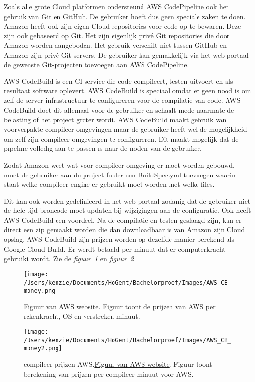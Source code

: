 Zoals alle grote Cloud platformen ondersteund AWS CodePipeline ook het gebruik van Git en GitHub. De gebruiker hoeft dus geen speciale zaken te doen. Amazon heeft ook zijn eigen Cloud repositories voor code op te bewaren. Deze zijn ook gebaseerd op Git. Het zijn eigenlijk privé Git repositories die door Amazon worden aangeboden. Het gebruik verschilt niet tussen GitHub en Amazon zijn privé Git servers. De gebruiker kan gemakkelijk via het web portaal de gewenste Git-projecten toevoegen aan AWS CodePipeline.

AWS CodeBuild is een CI service die code compileert, testen uitvoert en als resultaat software oplevert. AWS CodeBuild is speciaal omdat er geen nood is om zelf de server infrastructuur te configureren voor de compilatie van code. AWS CodeBuild doet dit allemaal voor de gebruiker en schaalt mede naarmate de belasting of het project groter wordt. AWS CodeBuild maakt gebruik van voorverpakte compileer omgevingen maar de gebruiker heeft wel de mogelijkheid om zelf zijn compileer omgevingen te configureren. Dit maakt mogelijk dat de pipeline volledig aan te passen is naar de noden van de gebruiker. 

Zodat Amazon weet wat voor compileer omgeving er moet worden gebouwd, moet de gebruiker aan de project folder een BuildSpec.yml toevoegen waarin staat welke compileer engine er gebruikt moet worden met welke files. 

Dit kan ook worden gedefinieerd in het web portaal zodanig dat de gebruiker niet de hele tijd broncode moet updaten bij wijzigingen aan de configuratie. Ook heeft AWS CodeBuild een voordeel. Na de compilatie en testen geslaagd zijn, kan er direct een zip gemaakt worden die dan downloadbaar is van Amazon zijn Cloud opslag. AWS CodeBuild zijn prijzen worden op dezelfde manier berekend als Google Cloud Build. Er wordt betaald per minuut dat er computerkracht gebruikt wordt. Zie de \emph{figuur~\ref{fig:AWS_CB_money}} en \emph{figuur~\ref{fig:AWS_CB_money2}}

\begin{figure}[!htbp]
    \centering
    \texttt{[image: /Users/kenzie/Documents/HoGent/Bachelorproef/Images/AWS\_CB\_money.png]}
    \caption{ \href{prijzen AWS computekracht.}{Figuur van AWS website}. Figuur toont de prijzen van AWS per rekenkracht, OS en verstreken minuut.}
    \label{fig:AWS_CB_money}
\end{figure}
\begin{figure}[!htbp]
    \centering
    \texttt{[image: /Users/kenzie/Documents/HoGent/Bachelorproef/Images/AWS\_CB\_money2.png]}
    \caption{compileer prijzen AWS.\href{}{Figuur van AWS website}. Figuur toont berekening van prijzen per compileer minuut voor AWS.}
    \label{fig:AWS_CB_money2}
\end{figure}

